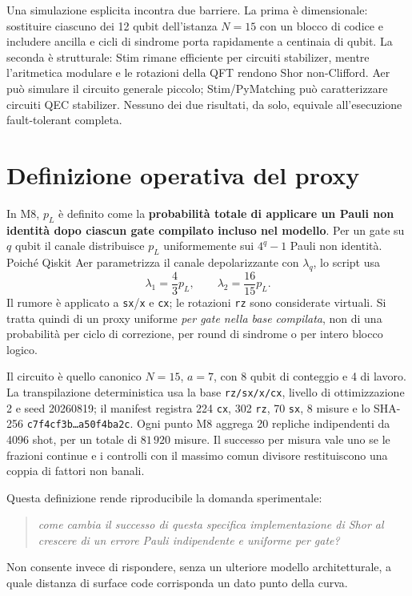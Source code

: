 \begin{onehalfspace}
Una simulazione esplicita incontra due barriere. La prima \`e dimensionale: sostituire ciascuno dei 12 qubit dell'istanza $N=15$ con un blocco di codice e includere ancilla e cicli di sindrome porta rapidamente a centinaia di qubit. La seconda \`e strutturale: Stim rimane efficiente per circuiti stabilizer, mentre l'aritmetica modulare e le rotazioni della \ac{QFT} rendono Shor non-Clifford. Aer pu\`o simulare il circuito generale piccolo; Stim/PyMatching pu\`o caratterizzare circuiti QEC stabilizer. Nessuno dei due risultati, da solo, equivale all'esecuzione fault-tolerant completa.

\section{Definizione operativa del proxy}
\label{sec:modello_logico}

In M8, $p_L$ \`e definito come la \textbf{probabilit\`a totale di applicare un Pauli non identit\`a dopo ciascun gate compilato incluso nel modello}. Per un gate su $q$ qubit il canale distribuisce $p_L$ uniformemente sui $4^q-1$ Pauli non identit\`a. Poich\'e Qiskit Aer parametrizza il canale depolarizzante con $\lambda_q$, lo script usa
\begin{equation}
    \lambda_1=\frac{4}{3}p_L,
    \qquad
    \lambda_2=\frac{16}{15}p_L.
\end{equation}
Il rumore \`e applicato a \texttt{sx}/\texttt{x} e \texttt{cx}; le rotazioni \texttt{rz} sono considerate virtuali. Si tratta quindi di un proxy uniforme \emph{per gate nella base compilata}, non di una probabilit\`a per ciclo di correzione, per round di sindrome o per intero blocco logico.

Il circuito \`e quello canonico $N=15$, $a=7$, con 8 qubit di conteggio e 4 di lavoro. La transpilazione deterministica usa la base \texttt{rz/sx/x/cx}, livello di ottimizzazione 2 e seed 20260819; il manifest registra 224 \texttt{cx}, 302 \texttt{rz}, 70 \texttt{sx}, 8 misure e lo SHA-256 \texttt{c7f4cf3b\ldots a50f4ba2c}. Ogni punto M8 aggrega 20 repliche indipendenti da 4096 shot, per un totale di $81\,920$ misure. Il successo per misura vale uno se le frazioni continue e i controlli con il massimo comun divisore restituiscono una coppia di fattori non banali.

Questa definizione rende riproducibile la domanda sperimentale:
\begin{quote}
\emph{come cambia il successo di questa specifica implementazione di Shor al crescere di un errore Pauli indipendente e uniforme per gate?}
\end{quote}
Non consente invece di rispondere, senza un ulteriore modello architetturale, a quale distanza di surface code corrisponda un dato punto della curva.


\end{onehalfspace}
